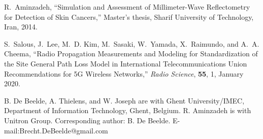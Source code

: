 \documentclass[preprint]{rsl}
\begin{document}
\begin{thebibliography}{9}
R.~Aminzadeh, ``Simulation and Assessment of Millimeter-Wave Reflectometry for
  Detection of Skin Cancers,'' Master's thesis, Sharif University of
  Technology, Iran, 2014.

S.~Salous, J.~Lee, M.~D. Kim, M.~Sasaki, W.~Yamada, X.~Raimundo, and A.~A. Cheema, 
``Radio Propagation Measurements and Modeling for Standardization of
  the Site General Path Loss Model in International Telecommunications Union
  Recommendations for 5G Wireless Networks,'' \emph{Radio Science}, \textbf{55}, 1, January 2020.

\end{thebibliography}
\suppressfloats

\vspace{7pt}

%
%
\noindent\small
B. De Beelde, A. Thielens, and W. Joseph are with Ghent University/IMEC, Department of Information Technology, Ghent, Belgium. 
R. Aminzadeh is with Unitron Group. 
Corresponding author: B. De Beelde. 
E-mail:Brecht.DeBeelde@gmail.com
\end{document}
